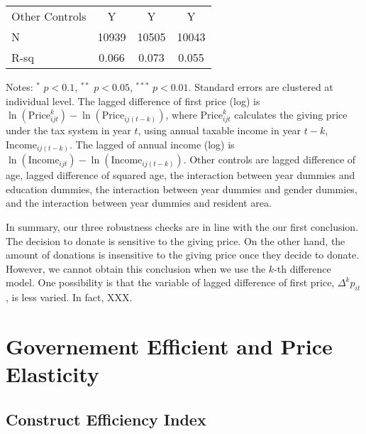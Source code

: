 \documentclass[ review  , 3p ]{elsarticle}
\begin{document}
\begin{table}
\begin{threeparttable}
\begin{tabular}[t]{lccc}
  \hspace{1em}Other Controls & Y & Y & Y\\
  \hspace{1em}N & 10939 & 10505 & 10043\\
  \hspace{1em}R-sq & 0.066 & 0.073 & 0.055\\
  \bottomrule
  \end{tabular}
  \begin{tablenotes}
  \item Notes: $^{*}$ $p < 0.1$, $^{**}$ $p < 0.05$, $^{***}$ $p < 0.01$. Standard errors are clustered at individual level. The lagged difference of first price (log) is $\ln(\text{Price}^k_{ijt}) - \ln(\text{Price}_{ij(t-k)})$, where $\text{Price}^k_{ijt}$ calculates the giving price under the tax system in year $t$, using annual taxable income in year $t-k$, $\text{Income}_{ij(t-k)}$. The lagged of annual income (log) is $\ln(\text{Income}_{ijt}) - \ln(\text{Income}_{ij(t-k)})$. Other controls are lagged difference of age, lagged difference of squared age, the interaction between year dummies and education dummies, the interaction between year dummies and gender dummies, and the interaction between year dummies and resident area.
  \end{tablenotes}
  \end{threeparttable}
  \end{table}

  In summary, our three robustness checks are in line with the our first conclusion.
  The decision to donate is sensitive to the giving price.
  On the other hand, the amount of donations is insensitive to the giving price once they decide to donate.
  However, we cannot obtain this conclusion when we use the \(k\)-th difference model.
  One possibility is that the variable of lagged difference of first price, \(\Delta^k p_{it}\), is less varied.
  In fact, \color{blue}XXX\color{black}.

  \hypertarget{governement-efficient-and-price-elasticity}{%
  \section{Governement Efficient and Price Elasticity}\label{governement-efficient-and-price-elasticity}}

  \hypertarget{construct-efficiency-index}{%
  \subsection{Construct Efficiency Index}\label{construct-efficiency-index}}
\end{document}
